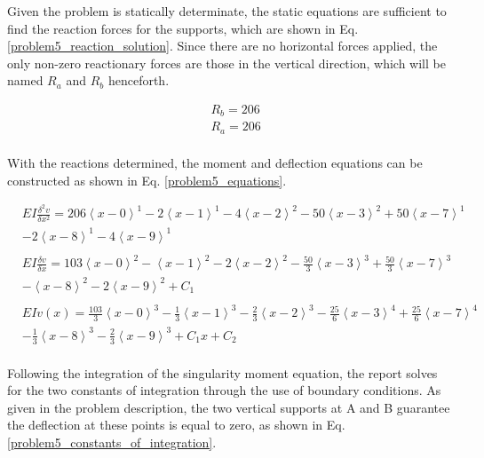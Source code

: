 \documentclass[a4paper]{article}
\begin{document}
Given the problem is statically determinate, the static equations are sufficient to find the reaction forces for the supports, which are shown in Eq. \ref{problem5_reaction_solution}. Since there are no horizontal forces applied, the only non-zero reactionary forces are those in the vertical direction, which will be named $R_a$ and $R_b$ henceforth.

\begin{equation}
\begin{split}
	& R_b = 206 \\
	& R_a = 206 \\
\end{split}
\label{problem5_reaction_solution}
\end{equation}

With the reactions determined, the moment and deflection equations can be constructed as shown in Eq. \ref{problem5_equations}.

\begin{equation}
    \begin{split}
& EI \frac{\delta^2 v}{\delta x^2} = 206\left<x-0\right>^1 - 2\left<x-1\right>^1 -  4\left<x-2\right>^2 - 50\left<x-3\right>^2 + 50\left<x-7\right>^1 \\
& - 2\left<x-8\right>^1 -  4\left<x-9\right>^1 \\
& \\
& EI \frac{\delta v}{\delta x} = 103\left<x-0\right>^2 - \left<x-1\right>^2 -  2\left<x-2\right>^2 - \frac{50}{3}\left<x-3\right>^3 + \frac{50}{3}\left<x-7\right>^3 \\
& - \left<x-8\right>^2 -  2\left<x-9\right>^2  + C_1\\
& \\
& EI v(x) = \frac{103}{3}\left<x-0\right>^3 - \frac{1}{3}\left<x-1\right>^3 -  \frac{2}{3}\left<x-2\right>^3 - \frac{25}{6}\left<x-3\right>^4 + \frac{25}{6}\left<x-7\right>^4 \\
& - \frac{1}{3}\left<x-8\right>^3 -  \frac{2}{3}\left<x-9\right>^3 + C_1x + C_2 \\
    \end{split}
\label{problem5_equations}
\end{equation}

Following the integration of the singularity moment equation, the report solves for the two constants of integration through the use of boundary conditions. As given in the problem description, the two vertical supports at A and B guarantee the deflection at these points is equal to zero, as shown in Eq. \ref{problem5_constants_of_integration}.
\end{document}
